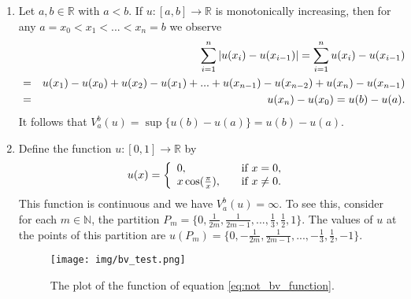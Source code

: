     \begin{example} %
    \label{ex:total_variation_one_d}

        \begin{enumerate}
            \item Let $a, b \in \mathbb{R}$ with $a < b$. If $u: [a, b] \longrightarrow \mathbb{R}$ is monotonically increasing, then for any $a = x_{0} < x_{1} < ... < x_{n} = b$ we observe
                \begin{eqnarray}
                    &&\sum_{i = 1}^{n} |u(x_{i}) - u(x_{i-1})| = \sum_{i = 1}^{n} u(x_{i}) - u(x_{i-1}) \notag \\
                    &=& u(x_{1}) - u(x_{0}) + u(x_{2}) - u(x_{1}) + ... + u(x_{n-1}) - u(x_{n-2}) + u(x_{n}) - u(x_{n-1}) \notag \\
                    &=& u(x_{n}) - u(x_{0}) = u(b) - u(a). \notag
                \end{eqnarray}
            It follows that $V^{b}_{a}(u) = \sup \{u(b) - u(a)\} = u(b) - u(a)$.
            \item Define the function $u: [0, 1] \longrightarrow \mathbb{R}$ by
                \begin{equation}
                    u(x) =
                    \left\{
                        \begin{array}{l l}
                            0,                      & \quad \text{if $x = 0$}, \\
                            x \cos(\frac{\pi}{x}),  & \quad \text{if $x \ne 0$}.
                        \end{array}
                    \right.
                    \label{eq:not_bv_function}
                \end{equation}
            This function is continuous and we have $V^{b}_{a}(u) = \infty$. To see this, consider for each $m \in \mathbb{N}$, the partition $P_{m} = \{ 0, \frac{1}{2m}, \frac{1}{2m-1}, ..., \frac{1}{3}, \frac{1}{2}, 1 \}$. The values of $u$ at the points of this partition are $u(P_{m}) = \{ 0, -\frac{1}{2m}, \frac{1}{2m-1}, ..., -\frac{1}{3}, \frac{1}{2}, -1 \}$.


        \begin{figure}[ht]
            \centering
            \texttt{[image: img/bv\_test.png]}
            \caption{The plot of the function of equation \ref{eq:not_bv_function}.}
            \label{fig:plot_of_not_bv_function}
        \end{figure}


\end{enumerate}
\end{example}
